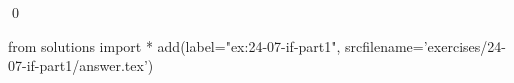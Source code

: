 
\begin{ex}
  \label{ex:24-07-if-part1}
  
  \qed
\end{ex}
\begin{python0}
from solutions import *
add(label="ex:24-07-if-part1",
    srcfilename='exercises/24-07-if-part1/answer.tex')
\end{python0}
